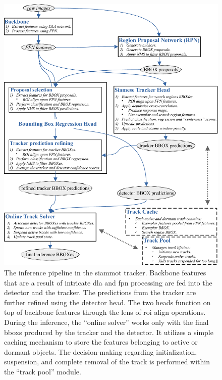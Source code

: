 \begin{figure}[H]
    \centering
    \includegraphics[width=\linewidth]{figures/siamese_tracking/siammot_inference_diagram.pdf}
    \caption[\gls{siammot} inference diagram]{The inference pipeline in the \gls{siammot} tracker. Backbone features that are a result of intricate \gls{dla} and \gls{fpn} processing are fed into the detector and the tracker. The predictions from the tracker are further refined using the detector head. The two heads function on top of backbone features through the lens of \gls{roi} align operations. During the inference, the ``online solver'' works only with the final \glspl{bbox} produced by the tracker and the detector. It utilizes a simple caching mechanism to store the features belonging to active or dormant objects. The decision-making regarding initialization, suspension, and complete removal of the track is performed within the ``track pool'' module.}
    \label{fig:SiamMOTInference}
\end{figure}

